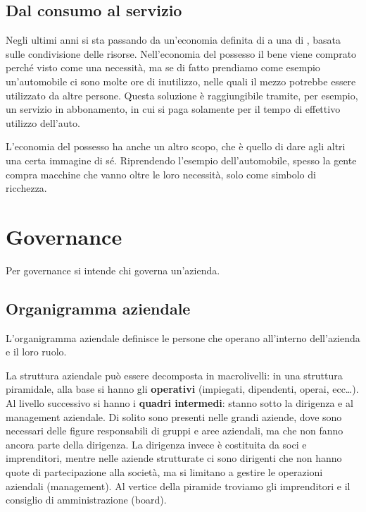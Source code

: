 \section{Dal consumo al servizio} 

Negli ultimi anni si sta passando da un'economia definita di
 a una di , basata sulle condivisione
delle risorse.
Nell'economia del possesso il bene viene comprato perché visto come una
necessità, ma se di fatto prendiamo come esempio un'automobile ci sono molte ore
di inutilizzo, nelle quali il mezzo potrebbe essere utilizzato da altre persone.
Questa soluzione è raggiungibile tramite, per esempio, un servizio in
abbonamento, in cui si paga solamente per il tempo di effettivo utilizzo
dell'auto.

L'economia del possesso ha anche un altro scopo, che è quello di dare agli altri
una certa immagine di sé. Riprendendo l'esempio dell'automobile, spesso la gente
compra macchine che vanno oltre le loro necessità, solo come simbolo di
ricchezza.


\chapter{Governance}

Per governance si intende chi governa un'azienda.

\section{Organigramma aziendale}
\begin{definition}
L'organigramma aziendale definisce le persone che operano all'interno
dell'azienda e il loro ruolo.
\end{definition}

\noindent La struttura aziendale può essere decomposta in macrolivelli: in una
struttura piramidale, alla base si hanno gli \textbf{operativi} (impiegati,
dipendenti, operai, ecc\dots). Al livello successivo si hanno i \textbf{quadri
intermedi}: stanno sotto la dirigenza e al management aziendale. Di solito sono
presenti nelle grandi aziende, dove sono necessari delle figure responsabili di
gruppi e aree aziendali, ma che non fanno ancora parte della dirigenza. La
dirigenza invece è costituita da soci e imprenditori, mentre nelle aziende
strutturate ci sono dirigenti che non hanno quote di partecipazione alla
società, ma si limitano a gestire le operazioni aziendali (management). Al
vertice della piramide troviamo gli imprenditori e il consiglio di
amministrazione (board).

